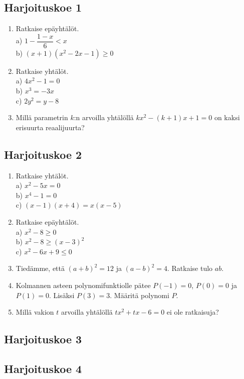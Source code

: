 
\subsection*{Harjoituskoe 1}

\begin{enumerate}
\item Ratkaise epäyhtälöt.\\ a) $1-\dfrac{1-x}{6}<x$\\ b) $(x+1)(x^2-2x-1)\geq0$
\item Ratkaise yhtälöt.\\ a) $4x^2-1=0$\\ b) $x^3=-3x$\\ c) $2y^2=y-8$
\item Millä parametrin $k$:n arvoilla yhtälöllä $kx^2-(k+1)x+1=0$ on kaksi erisuurta reaalijuurta? 

\end{enumerate}

\subsection*{Harjoituskoe 2}

\begin{enumerate}
\item Ratkaise yhtälöt.\\ a) $x^2-5x=0$\\ b) $x^4-1=0$\\ c) $(x-1)(x+4) = x(x-5)$
\item Ratkaise epäyhtälöt.\\ a) $x^2-8\geq0$\\ b) $x^2-8\geq(x-3)^2$\\ c) $x^2-6x+9\leq0$
\item Tiedämme, että $(a+b)^2=12$ ja $(a-b)^2=4$. Ratkaise tulo $ab$.
\item Kolmannen asteen polynomifunktiolle pätee $P(-1)=0$, $P(0)=0$ ja $P(1)=0$. Lisäksi $P(3)=3$. Määritä polynomi $P$.
\item Millä vakion $t$ arvoilla yhtälöllä $tx^2+tx-6=0$ ei ole ratkaisuja?
\end{enumerate}


\subsection*{Harjoituskoe 3}


\subsection*{Harjoituskoe 4}
